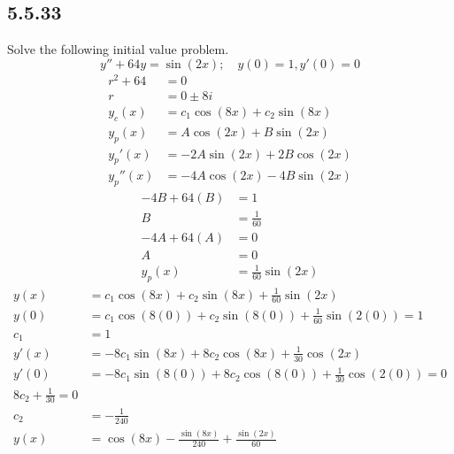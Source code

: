 \documentclass{article}
\begin{document}
\subsection{5.5.33}
Solve the following initial value problem.
$$ y'' + 64y = \sin(2x); \quad y(0) = 1, y'(0) = 0 $$
\begin{align*}
	r^2 + 64 & = 0 \\
	r & = 0 \pm 8i \\
	y_c(x) & = c_1\cos(8x) + c_2\sin(8x) \\
	y_p(x) & = A\cos(2x) + B\sin(2x) \\
	y_p'(x) & = -2A\sin(2x) + 2B\cos(2x) \\
	y_p''(x) & = -4A\cos(2x) - 4B\sin(2x)
\end{align*}
\begin{align*}
	-4B + 64(B) & = 1 \\
	B & = \frac{1}{60} \\
	-4A + 64(A) & = 0 \\
	A & = 0 \\
	y_p(x) & = \frac{1}{60}\sin(2x)
\end{align*}
\begin{align*}
	y(x) & = c_1\cos(8x) + c_2\sin(8x) + \frac{1}{60}\sin(2x) \\
	y(0) & = c_1\cos(8(0)) + c_2\sin(8(0)) + \frac{1}{60}\sin(2(0)) = 1 \\
	c_1 & = 1 \\
	y'(x) & = -8c_1\sin(8x) + 8c_2\cos(8x) + \frac{1}{30}\cos(2x) \\
	y'(0) & = -8c_1\sin(8(0)) + 8c_2\cos(8(0)) + \frac{1}{30}\cos(2(0)) = 0 \\
	8c_2 + \frac{1}{30} = 0 \\
	c_2 & = -\frac{1}{240} \\
	y(x) & = \cos(8x) - \frac{\sin(8x)}{240} + \frac{\sin(2x)}{60}
\end{align*}
\end{document}

